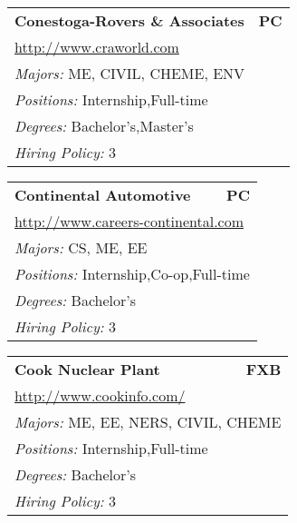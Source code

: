 \documentclass[twoside]{article}
\begin{document}
\begin{center}
\begin{multicols}{3}
\begin{FlushLeft}
\begin{minipage}{.9\columnwidth}
\end{minipage}
 
\begin{minipage}{.9\columnwidth}\begin{tabularx}{.95\columnwidth}{Xr}
                 {\Large\bf Conestoga-Rovers \& Associates} & {\Large\bf PC}\\
    \multicolumn{2}{p{.95\columnwidth}}{\url{http://www.craworld.com}}\\
    \multicolumn{2}{p{.95\columnwidth}}{\emph{Majors:} ME, CIVIL, CHEME, ENV}\\
    \multicolumn{2}{p{.95\columnwidth}}{\emph{Positions:} Internship,Full-time}\\
    \multicolumn{2}{p{.95\columnwidth}}{\emph{Degrees:} Bachelor's,Master's}\\
    \multicolumn{2}{p{.95\columnwidth}}{\emph{Hiring Policy:} 3}\\
    \end{tabularx}
    
\end{minipage}
 
\begin{minipage}{.9\columnwidth}\begin{tabularx}{.95\columnwidth}{Xr}
                 {\Large\bf Continental Automotive} & {\Large\bf PC}\\
    \multicolumn{2}{p{.95\columnwidth}}{\url{http://www.careers-continental.com}}\\
    \multicolumn{2}{p{.95\columnwidth}}{\emph{Majors:} CS, ME, EE}\\
    \multicolumn{2}{p{.95\columnwidth}}{\emph{Positions:} Internship,Co-op,Full-time}\\
    \multicolumn{2}{p{.95\columnwidth}}{\emph{Degrees:} Bachelor's}\\
    \multicolumn{2}{p{.95\columnwidth}}{\emph{Hiring Policy:} 3}\\
    \end{tabularx}
    
\end{minipage}
 
\begin{minipage}{.9\columnwidth}\begin{tabularx}{.95\columnwidth}{Xr}
                 {\Large\bf Cook Nuclear Plant} & {\Large\bf FXB}\\
    \multicolumn{2}{p{.95\columnwidth}}{\url{http://www.cookinfo.com/}}\\
    \multicolumn{2}{p{.95\columnwidth}}{\emph{Majors:} ME, EE, NERS, CIVIL, CHEME}\\
    \multicolumn{2}{p{.95\columnwidth}}{\emph{Positions:} Internship,Full-time}\\
    \multicolumn{2}{p{.95\columnwidth}}{\emph{Degrees:} Bachelor's}\\
    \multicolumn{2}{p{.95\columnwidth}}{\emph{Hiring Policy:} 3}\\
    \end{tabularx}
    

\end{minipage}
\end{FlushLeft}
\end{multicols}
\end{center}
\end{document}
